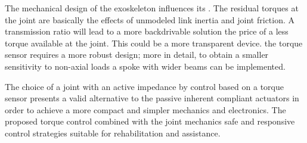 \par The mechanical design of the exoskeleton influences its \DIFdelbegin {}\DIFdelend \DIFaddbegin {}\DIFaddend . The residual torques at the joint are basically the effects of  \DIFdelbegin {}\DIFdelend unmodeled link inertia and  \DIFdelbegin {}\DIFdelend joint friction. A  \DIFdelbegin {}\DIFdelend \DIFaddbegin {}\DIFaddend transmission ratio will lead to a more backdrivable solution \DIFdelbegin {}\DIFdelend \DIFaddbegin {}\DIFaddend the price of a less torque available at the joint. This could be a \DIFdelbegin {}\DIFdelend \DIFaddbegin {}\DIFaddend more transparent device. \DIFdelbegin {}\DIFdelend \DIFaddbegin {}\DIFaddend the torque sensor requires a more robust design; more in detail, to obtain a smaller sensitivity to non-axial loads a spoke with wider beams can be implemented.
\par The choice of a joint with an active impedance by control based on a torque sensor presents a valid alternative to the passive inherent compliant actuators in order to achieve a more compact and simpler mechanics and electronics. The proposed torque control combined with the joint mechanics \DIFdelbegin {}\DIFdelend \DIFaddbegin {}\DIFaddend safe and responsive control strategies suitable for rehabilitation and assistance.